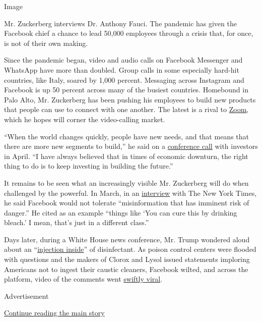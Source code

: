 Image

Mr. Zuckerberg interviews Dr. Anthony Fauci. The pandemic has given the
Facebook chief a chance to lead 50,000 employees through a crisis that,
for once, is not of their own making.

Since the pandemic began, video and audio calls on Facebook Messenger
and WhatsApp have more than doubled. Group calls in some especially
hard-hit countries, like Italy, soared by 1,000 percent. Messaging
across Instagram and Facebook is up 50 percent across many of the
busiest countries. Homebound in Palo Alto, Mr. Zuckerberg has been
pushing his employees to build new products that people can use to
connect with one another. The latest is a rival to
\href{https://www.nytimes.com/2020/04/24/technology/zoom-rivals-virus-facebook-google.html}{Zoom},
which he hopes will corner the video-calling market.

``When the world changes quickly, people have new needs, and that means
that there are more new segments to build,'' he said on a
\href{https://www.fool.com/earnings/call-transcripts/2020/04/29/facebook-inc-fb-q1-2020-earnings-call-transcript.aspx}{conference
call} with investors in April. ``I have always believed that in times of
economic downturn, the right thing to do is to keep investing in
building the future.''

It remains to be seen what an increasingly visible Mr. Zuckerberg will
do when challenged by the powerful. In March, in an
\href{https://www.nytimes.com/2020/03/15/business/media/coronavirus-facebook-twitter-social-media.html}{interview}
with The New York Times, he said Facebook would not tolerate
``misinformation that has imminent risk of danger.'' He cited as an
example ``things like `You can cure this by drinking bleach.' I mean,
that's just in a different class.''

Days later, during a White House news conference, Mr. Trump wondered
aloud about an
``\href{https://www.nytimes.com/2020/04/24/us/politics/trump-inject-disinfectant-bleach-coronavirus.html}{injection
inside}'' of disinfectant. As poison control centers were flooded with
questions and the makers of Clorox and Lysol issued statements imploring
Americans not to ingest their caustic cleaners, Facebook wilted, and
across the platform, video of the comments went
\href{https://www.nytimes.com/2020/04/30/technology/trump-coronavirus-social-media.html}{swiftly
viral}.

Advertisement

\protect\hyperlink{after-bottom}{Continue reading the main story}

